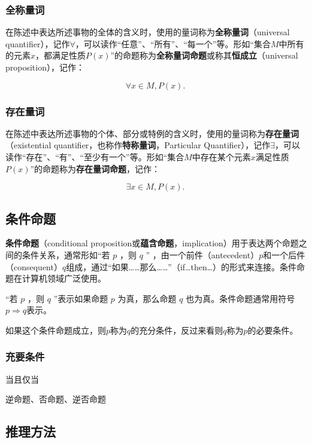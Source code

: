\subsubsection{全称量词}

在陈述中表达所述事物的全体的含义时，使用的量词称为\textbf{全称量词}（universal quantifier），记作$\forall$，可以读作“任意”、“所有”、“每一个”等。形如“集合$M$中所有的元素$x$，都满足性质$P(x)$”的命题称为\textbf{全称量词命题}或称其\textbf{恒成立}（universal proposition），记作：

\begin{equation}
\forall x\in M,P(x).~
\end{equation}

\subsubsection{存在量词}

在陈述中表达所述事物的个体、部分或特例的含义时，使用的量词称为\textbf{存在量词}（existential quantifier，也称作\textbf{特称量词}，Particular Quantifier），记作$\exists$，可以读作“存在”、“有”、“至少有一个”等。形如“集合$M$中存在某个元素$x$满足性质$P(x)$”的命题称为\textbf{存在量词命题}，记作：

\begin{equation}
\exists x\in M,P(x).~
\end{equation}

\subsection{条件命题}

\textbf{条件命题}（conditional proposition或\textbf{蕴含命题}，implication）用于表达两个命题之间的条件关系，通常形如“若 $p$ ，则 $q$ ” ，由一个前件（antecedent）$p$和一个后件（consequent）$q$组成，通过“如果……那么……”（if…then…）的形式来连接。条件命题在计算机领域广泛使用。

“若 $p$ ，则 $q$ ”表示如果命题 $p$ 为真，那么命题 $q$ 也为真。条件命题通常用符号$p\Rightarrow q$表示。

如果这个条件命题成立，则$p$称为$q$的充分条件，反过来看则$q$称为$p$的必要条件。

\subsubsection{充要条件}

当且仅当

逆命题、否命题、逆否命题

\subsection{推理方法}

